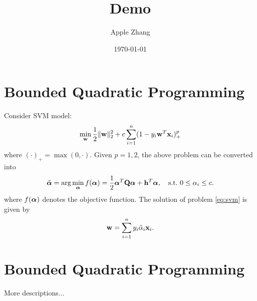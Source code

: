 \documentclass{article}
\title{Demo}
\author{Apple Zhang}
\date{\today}
\begin{document}
\maketitle


\section{Bounded Quadratic Programming}
Consider SVM model:
\begin{align}
    \min_{{\mathbf w}}\frac12\|{\mathbf w}\|_2^2+c\sum_{i=1}^n(1-y_i{\mathbf w}^T{\mathbf x}_i)^{p}_+\label{eq:svm}
\end{align}
where $(\cdot)_+=\max(0,\cdot)$.
Given $p=1,2$, the above problem can be converted into
\begin{align}
    \tilde{{\bm\alpha}}=\arg\min_{{\bm\alpha}}f({\bm\alpha})=\frac12{\bm\alpha}^T{\mathbf Q}{\bm\alpha}+{\mathbf h}^T{\bm\alpha},\quad \mathrm{s.t.}~0\leq\alpha_i\leq c.\label{eq:boxqp}
\end{align}
where $f({\bm\alpha})$ denotes the objective function.
The solution of problem \eqref{eq:svm} is given by
\begin{equation}
    {\mathbf w}=\sum_{i=1}^ny_i\tilde\alpha_i{\mathbf x}_i.
\end{equation}


\section{Bounded Quadratic Programming}
More descriptions...





\end{document}
